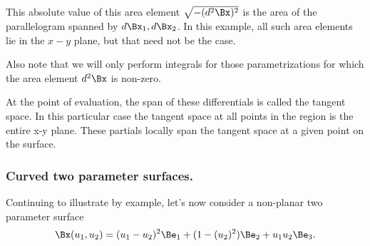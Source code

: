 This absolute value of this area element \( \sqrt{-(d^2 \Bx)^2} \) is the area of the parallelogram spanned by \( d\Bx_1, d\Bx_2 \).
In this example, all such area elements lie in the \( x-y \) plane, but that need not be the case.

Also note that we will only perform integrals for those parametrizations for which the area element \( d^2 \Bx \) is non-zero.




At the point of evaluation, the span of these differentials is called the tangent space.
In this particular case the tangent space at all points in the region is the entire x-y plane.
These partials locally span the tangent space at a given point on the surface.

\subsubsection{Curved two parameter surfaces.}

Continuing to illustrate by example, let's now consider a non-planar two parameter surface
\begin{equation}\label{eqn:curvilinearDefined:560}
\Bx(u_1, u_2) =
(u_1-u_2)^2
\Be_1
+ (1-(u_2)^2 ) \Be_2
+ u_1 u_2 \Be_3.
\end{equation}

